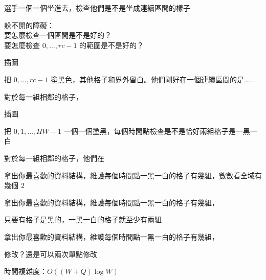 \begin{frame}{}
    選手一個一個坐進去，檢查他們是不是坐成連續區間的樣子

    躲不開的障礙：\\
    要怎麼檢查一個區間是不是好的？\\
    要怎麼檢查 $0, \dots, rc - 1$ 的範圍是不是好的？
\end{frame}

\begin{frame}{}
    \todo 插圖
\end{frame}

\begin{frame}{}
    把 $0, \dots, rc - 1$ 塗黑色，其他格子和界外留白。他們剛好在一個連續區間的是......

     {
        對於每一組相鄰的格子， \\
    }
\end{frame}

\begin{frame}{}
    \todo 插圖
\end{frame}

\begin{frame}{}
    把 $0, 1, \dots, HW - 1$ 一個一個塗黑，每個時間點檢查是不是恰好兩組格子是一黑一白
\end{frame}

\begin{frame}{}
    對於每一組相鄰的格子，他們在

     {
        拿出你最喜歡的資料結構，維護每個時間點一黑一白的格子有幾組，數數看全域有幾個 $2$
    }

     {
        拿出你最喜歡的資料結構，維護每個時間點一黑一白的格子有幾組，
    }

     {
        只要有格子是黑的，一黑一白的格子就至少有兩組

        拿出你最喜歡的資料結構，維護每個時間點一黑一白的格子有幾組，
    }
\end{frame}

\begin{frame}{}
    修改？還是可以兩次單點修改

    時間複雜度：$O((W + Q) \log W)$
\end{frame}

